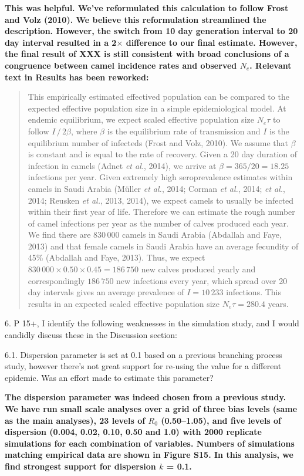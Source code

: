 \documentclass[11pt,oneside,letterpaper]{article}
\begin{document}
\textbf{This was helpful. We've reformulated this calculation to follow Frost and Volz (2010). We believe this reformulation streamlined the description. However, the switch from 10 day generation interval to 20 day interval resulted in a 2$\times$ difference to our final estimate. However, the final result of XXX is still consistent with broad conclusions of a congruence between camel incidence rates and observed $N_e$. Relevant text in Results has been reworked:}

\begin{quotation}
This empirically estimated effectived population can be compared to the expected effective population size in a simple epidemiological model.
At endemic equilibrium, we expect scaled effective population size $N_{e}\tau$ to follow $I \, / \, 2 \beta$, where $\beta$ is the equilibrium rate of transmission and $I$ is the equilibrium number of infecteds (Frost and Volz, 2010).
We assume that $\beta$ is constant and is equal to the rate of recovery.
Given a 20 day duration of infection in camels (Adnet \textit{et al.}, 2014), we arrive at $\beta = 365/20 = 18.25$ infections per year.
Given extremely high seroprevalence estimates within camels in Saudi Arabia (M\"uller \textit{et al.}, 2014; Corman \textit{et al.}, 2014; \textit{et al.}, 2014; Reusken \textit{et al.}, 2013, 2014), we expect camels to usually be infected within their first year of life.
Therefore we can estimate the rough number of camel infections per year as the number of calves produced each year.
We find there are $830\,000$ camels in Saudi Arabia (Abdallah and Faye, 2013) and that female camels in Saudi Arabia have an average fecundity of 45\% (Abdallah and Faye, 2013).
Thus, we expect $830\,000 \times 0.50 \times 0.45 = 186\,750$ new calves produced yearly and correspondingly $186\,750$ new infections every year, which spread over 20 day intervals gives an average prevalence of $I = 10\,233$ infections.
This results in an expected scaled effective population size $N_{e}\tau=280.4$ years.
\end{quotation}

6. P 15+, I identify the following weaknesses in the simulation study, and I would candidly discuss these in the Discussion section:

6.1. Dispersion parameter is set at 0.1 based on a previous branching process study, however there's not great support for re-using the value for a different epidemic. Was an effort made to estimate this parameter?

\textbf{The dispersion parameter was indeed chosen from a previous study. We have run small scale analyses over a grid of three bias levels (same as the main analyses), 23 levels of $R_{0}$ (0.50--1.05), and five levels of dispersion (0.004, 0.02, 0.10, 0.50 and 1.0) with 2000 replicate simulations for each combination of variables. Numbers of simulations matching empirical data are shown in Figure S15. In this analysis, we find strongest support for dispersion $k$ = 0.1.}
\end{document}
